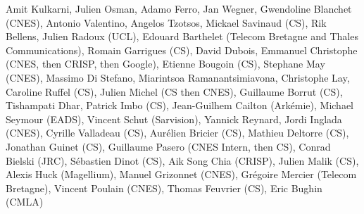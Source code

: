 Amit Kulkarni, Julien Osman, Adamo Ferro, Jan Wegner, Gwendoline Blanchet (CNES), Antonio Valentino, Angelos Tzotsos, Mickael Savinaud (CS), Rik Bellens, Julien Radoux (UCL), Edouard Barthelet (Telecom Bretagne and Thales Communications), Romain Garrigues (CS), David Dubois, Emmanuel Christophe (CNES, then CRISP, then Google), Etienne Bougoin (CS), Stephane May (CNES), Massimo Di Stefano, Miarintsoa Ramanantsimiavona, Christophe Lay, Caroline Ruffel (CS), Julien Michel (CS then CNES), Guillaume Borrut (CS), Tishampati Dhar, Patrick Imbo (CS), Jean-Guilhem Cailton (Ark\'emie), Michael Seymour (EADS), Vincent Schut (Sarvision), Yannick Reynard, Jordi Inglada (CNES), Cyrille Valladeau (CS), Aur\'elien Bricier (CS), Mathieu Deltorre (CS), Jonathan Guinet (CS), Guillaume Pasero (CNES Intern, then CS), Conrad Bielski (JRC), S\'ebastien Dinot (CS), Aik Song Chia (CRISP), Julien Malik (CS), Alexis Huck (Magellium), Manuel Grizonnet (CNES), Gr\'egoire Mercier (Telecom Bretagne), Vincent Poulain (CNES), Thomas Feuvrier (CS), Eric Bughin (CMLA)